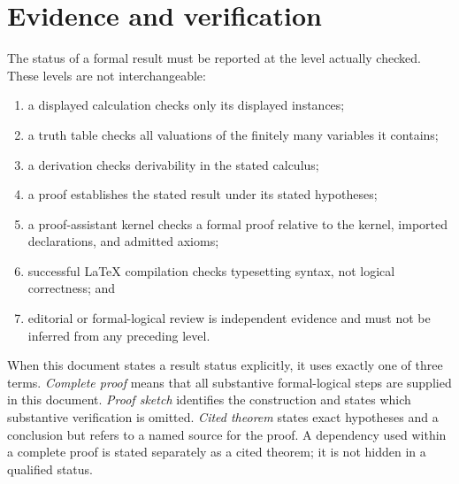 \section*{Evidence and verification}

The status of a formal result must be reported at the level actually checked.
These levels are not interchangeable:
\begin{enumerate}
  \item a displayed calculation checks only its displayed instances;
  \item a truth table checks all valuations of the finitely many variables it
        contains;
  \item a derivation checks derivability in the stated calculus;
  \item a proof establishes the stated result under its stated
        hypotheses;
  \item a proof-assistant kernel checks a formal proof relative to the kernel,
        imported declarations, and admitted axioms;
  \item successful \LaTeX{} compilation checks typesetting syntax, not logical
        correctness; and
  \item editorial or formal-logical review is independent evidence and must not be
        inferred from any preceding level.
\end{enumerate}

When this document states a result status explicitly, it uses exactly one of
three terms.  \emph{Complete proof} means that all substantive formal-logical
steps are supplied in this document.  \emph{Proof sketch} identifies the
construction and states which substantive verification is omitted.
\emph{Cited theorem} states exact hypotheses and a conclusion but refers to a
named source for the proof.  A dependency used within a complete proof is
stated separately as a cited theorem; it is not hidden in a qualified status.


